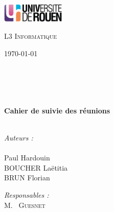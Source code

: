 
\begin{titlepage}

\begin{center}

\begin{minipage}[t]{0.48\textwidth}
  \begin{flushleft}
    \includegraphics [width=30mm]{images/logo-univ.jpg} \\[0.5cm]
    \begin{spacing}{1.5}
      \textsc{L3 Informatique}
    \end{spacing}
  \end{flushleft}
\end{minipage}
\begin{minipage}[t]{0.48\textwidth}
  \begin{flushright}
    \today
  \end{flushright}
\end{minipage} \\[1.5cm]

\textsc{\Large \reportsubject}\\[0.5cm]
\HRule \\[0.4cm]
{\huge \bfseries \reporttitle \\ Cahier de suivie des réunions}\\[0.4cm]
\HRule \\[1.5cm]

\parskip=200pt

\begin{minipage}[t]{0.3\textwidth}
  \begin{flushleft} \large
    \emph{Auteurs :}\\
    \reportauthor \\ 
    Paul Hardouin \\ 
    BOUCHER Laëtitia \\ 
    BRUN Florian
  \end{flushleft}
\end{minipage}
\begin{minipage}[t]{0.6\textwidth}
  \begin{flushright} \large
    \emph{Responsables :} \\
    M.~ \textsc{Guesnet} \\
  \end{flushright}
\end{minipage}

\vfill

\end{center}

\end{titlepage}
